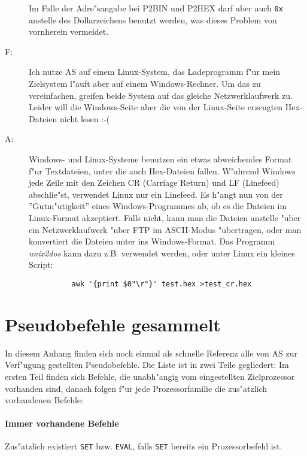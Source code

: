\documentclass[12pt,a4paper,twoside]{report}
\newcommand{\tty}[1]{{\tt #1}}
\begin{document}
\begin{description}
{          Im Falle der Adre"sangabe bei P2BIN und P2HEX darf aber auch
          \tty{0x} anstelle des Dollarzeichens benutzt werden, was dieses
          Problem von vornherein vermeidet.}
\vspace{0.3cm}
\item[F:]{Ich nutze AS auf einem Linux-System, das Ladeprogramm f"ur
          mein Zielsystem l"auft aber auf einem Windows-Rechner.  Um das
          zu vereinfachen, greifen beide System auf das gleiche
          Netzwerklaufwerk zu.  Leider will die Windows-Seite aber die
          von der Linux-Seite erzeugten Hex-Dateien nicht lesen :-(}
\item[A:]{Windows- und Linux-Systeme benutzen ein etwas abweichendes
          Format f"ur Textdateien, unter die auch Hex-Dateien fallen.
          W"ahrend Windows jede Zeile mit den Zeichen CR (Carriage Return)
          und LF (Linefeed) abschlie"st, verwendet Linux nur ein Linefeed.
          Es h"angt nun von der ''Gutm"utigkeit'' eines Windows-Programmes
          ab, ob es die Dateien im Linux-Format akzeptiert.  Falls nicht,
          kann man die Dateien anstelle "uber ein Netzwerklaufwerk "uber
          FTP im ASCII-Modus "ubertragen, oder man konvertiert die Dateien
          unter ins Windows-Format.  Das Programm {\em unix2dos} kann dazu
          z.B. verwendet werden, oder unter Linux ein kleines Script:
          \begin{verbatim}
          awk '{print $0"\r"}' test.hex >test_cr.hex
          \end{verbatim}}
\end{description}


\cleardoublepage
\chapter{Pseudobefehle gesammelt}

In diesem Anhang finden sich noch einmal als schnelle Referenz alle
von AS zur Verf"ugung gestellten Pseudobefehle.  Die Liste ist in zwei
Teile gegliedert: Im ersten Teil finden sich Befehle, die unabh"angig
vom eingestellten Zielprozessor vorhanden sind, danach folgen f"ur
jede Prozessorfamilie die zus"atzlich vorhandenen Befehle:

\subsubsection{Immer vorhandene Befehle}

Zus"atzlich existiert \tty{SET} bzw. \tty{EVAL}, falls \tty{SET} bereits
ein Prozessorbefehl ist.
\end{document}
